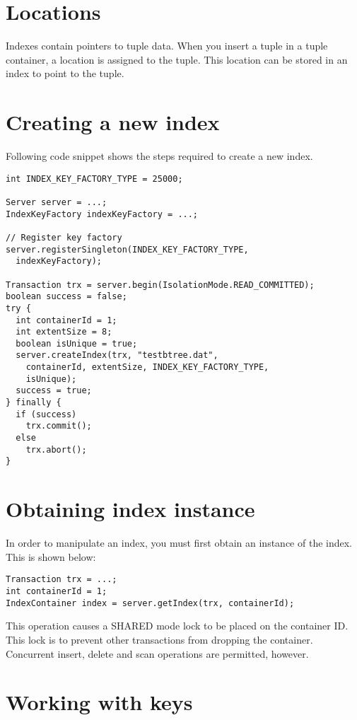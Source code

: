 \documentclass[a4paper,draft,oneside]{book}
\begin{document}
\section{Locations}

Indexes contain pointers to tuple data. When you insert a tuple in a
tuple container, a location is assigned to the tuple. This location
can be stored in an index to point to the tuple.

\section{Creating a new index}

Following code snippet shows the steps required to create a new
index.

\begin{verbatim}
int INDEX_KEY_FACTORY_TYPE = 25000;

Server server = ...;
IndexKeyFactory indexKeyFactory = ...;

// Register key factory
server.registerSingleton(INDEX_KEY_FACTORY_TYPE, 
  indexKeyFactory);

Transaction trx = server.begin(IsolationMode.READ_COMMITTED);
boolean success = false;
try {
  int containerId = 1;
  int extentSize = 8;
  boolean isUnique = true;
  server.createIndex(trx, "testbtree.dat", 
    containerId, extentSize, INDEX_KEY_FACTORY_TYPE, 
    isUnique);
  success = true;
} finally {
  if (success)
    trx.commit();
  else
    trx.abort();
}
\end{verbatim}

\section{Obtaining index instance}

In order to manipulate an index, you must first obtain an instance of
the index. This is shown below:

\begin{verbatim}
Transaction trx = ...;
int containerId = 1;
IndexContainer index = server.getIndex(trx, containerId);
\end{verbatim}

This operation causes a SHARED mode lock to be placed on the container
ID. This lock is to prevent other transactions from dropping the
container. Concurrent insert, delete and scan operations are
permitted, however.

\section{Working with keys}
\end{document}
